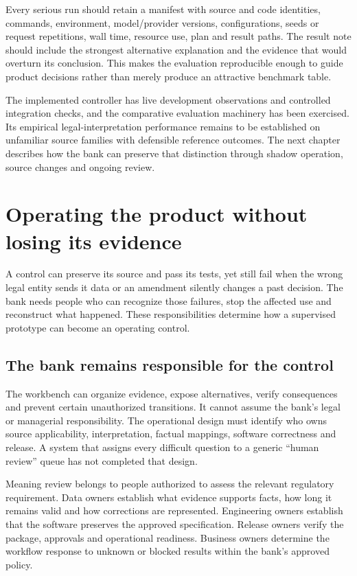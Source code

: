 \documentclass[12pt,a4paper,oneside,openany]{book}
\begin{document}
Every serious run should retain a manifest with source and code identities,
commands, environment, model/provider versions, configurations, seeds or request
repetitions, wall time, resource use, plan and result paths. The result note should
include the strongest alternative explanation and the evidence that would overturn
its conclusion. This makes the evaluation reproducible enough to guide product
decisions rather than merely produce an attractive benchmark table.

The implemented controller has live development observations and controlled
integration checks, and the comparative evaluation machinery has been exercised.
Its empirical legal-interpretation performance remains to be established on
unfamiliar source families with defensible reference outcomes. The next chapter describes how the bank
can preserve that distinction through shadow operation, source changes and
ongoing review.

\chapter{Operating the product without losing its evidence}
\label{ch:operation}

A control can preserve its source and pass its tests, yet still fail when the
wrong legal entity sends it data or an amendment silently changes a past
decision. The bank needs people who can recognize those failures, stop the
affected use and reconstruct what happened. These responsibilities determine
how a supervised prototype can become an operating control.

\section{The bank remains responsible for the control}
\label{merge:M10:00}


The workbench can organize evidence, expose alternatives, verify consequences and
prevent certain unauthorized transitions. It cannot assume the bank's legal or
managerial responsibility. The operational design must identify who owns source
applicability, interpretation, factual mappings, software correctness and release.
A system that assigns every difficult question to a generic ``human review'' queue
has not completed that design.

Meaning review belongs to people authorized to assess the relevant regulatory
requirement. Data owners establish what evidence supports facts, how long it
remains valid and how corrections are represented. Engineering owners establish
that the software preserves the approved specification. Release owners verify the
package, approvals and operational readiness. Business owners determine the
workflow response to unknown or blocked results within the bank's approved policy.
\end{document}
